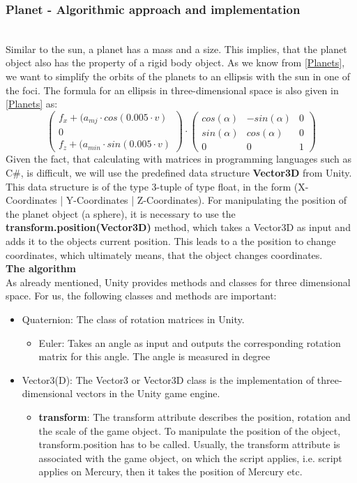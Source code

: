 \documentclass[conference,compsoc]{IEEEtran}
\begin{document}
\subsubsection{Planet - Algorithmic approach and implementation} \hfill\\
Similar to the sun, a planet has a mass and a size. This implies, that the planet object also has the property of a rigid body object. 
As we know from \ref{Planets}, we want to simplify the orbits of the planets to an ellipsis with the sun in one of the foci. The formula for an ellipsis in three-dimensional space is also given in \ref{Planets} as:
$$\begin{pmatrix}
	f_{x} + (a_{mj} \cdot cos(0.005 \cdot v) \\ 0\\
	f_{z} + (a_{min} \cdot sin(0.005 \cdot v)
\end{pmatrix} \cdot \begin{pmatrix}
	cos(\alpha) & -sin(\alpha) & 0 \\
	sin(\alpha) & cos(\alpha) & 0 \\
	0 & 0 & 1
\end{pmatrix} $$
Given the fact, that calculating with matrices in programming languages such as C\#, is difficult, we will use the predefined data structure \textbf{Vector3D} from Unity. This data structure is of the type 3-tuple of type float, in the form (X-Coordinates | Y-Coordinates | Z-Coordinates). For manipulating the position of the planet object (a sphere), it is necessary to use the \textbf{transform.position(Vector3D)} method, which takes a Vector3D as input and adds it to the objects current position. This leads to a the position to change coordinates, which ultimately means, that the object changes coordinates. \\
\textbf{The algorithm} \\
As already mentioned, Unity provides methods and classes for three dimensional space. For us, the following classes and methods are important:
\begin{itemize}
	\item Quaternion: The class of rotation matrices in Unity. 
	\begin{itemize}
		\item Euler: Takes an angle as input and outputs the corresponding rotation matrix for this angle. The angle is measured in degree
	\end{itemize}
	\item Vector3(D): The Vector3 or Vector3D class is the implementation of three-dimensional vectors in the Unity game engine. 
	\begin{itemize}
		\item \textbf{transform}: The transform attribute describes the position, rotation and the scale of the game object. To manipulate the position of the object, transform.position has to be called. Usually, the transform attribute is associated with the game object, on which the script applies, i.e. script applies on Mercury, then it takes the position of Mercury etc. 
	\end{itemize}
\end{itemize}
\end{document}

